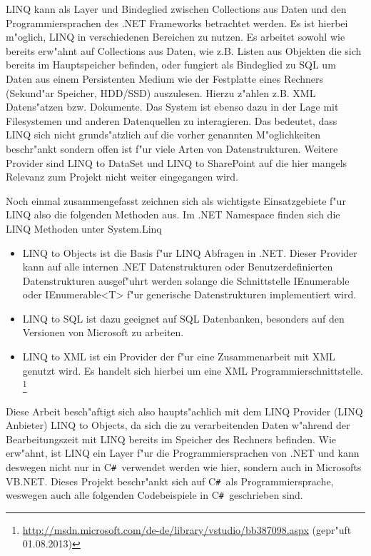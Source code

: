 \documentclass[pagesize, paper=a4, fontsize=12pt,titlepage=true, headings=small, headnosepline, abstractoff, liststotoc, nochapterprefix, plainheadsepline]{scrreprt}
\newcommand{\CSS}{C\texttt{\# }}
\begin{document}
LINQ kann als Layer und Bindeglied zwischen Collections aus Daten und den Programmiersprachen des .NET Frameworks betrachtet werden. Es ist hierbei m"oglich, LINQ in verschiedenen Bereichen zu nutzen. Es arbeitet sowohl wie bereits erw"ahnt auf Collections aus Daten, wie z.B. Listen aus Objekten die sich bereits im Hauptspeicher befinden, oder fungiert als Bindeglied zu SQL um Daten aus einem Persistenten Medium wie der Festplatte eines Rechners (Sekund"ar Speicher, HDD/SSD) auszulesen. Hierzu z"ahlen z.B. XML Datens"atzen bzw. Dokumente. Das System ist ebenso dazu in der Lage mit Filesystemen und anderen Datenquellen zu interagieren. Das bedeutet, dass LINQ sich nicht grunds"atzlich auf die vorher genannten M"oglichkeiten beschr"ankt sondern offen ist f"ur viele Arten von Datenstrukturen. Weitere Provider sind LINQ to DataSet und LINQ to SharePoint auf die hier mangels Relevanz zum Projekt nicht weiter eingegangen wird.
\newline

Noch einmal zusammengefasst zeichnen sich als wichtigste Einsatzgebiete f"ur LINQ also die folgenden Methoden aus. Im .NET Namespace finden sich die LINQ Methoden unter System.Linq
\begin{itemize}
\item LINQ to Objects ist die Basis f"ur LINQ Abfragen in .NET. Dieser Provider kann auf alle internen .NET Datenstrukturen oder Benutzerdefinierten Datenstrukturen ausgef"uhrt werden solange die Schnittstelle IEnumerable oder IEnumerable<T> f"ur generische Datenstrukturen implementiert wird.
\item LINQ to SQL ist dazu geeignet auf SQL Datenbanken, besonders auf den Versionen von Microsoft zu arbeiten.
\item LINQ to XML ist ein Provider der f"ur eine Zusammenarbeit mit XML genutzt wird. Es handelt sich hierbei um eine XML Programmierschnittstelle. \cite{MicrosoftCReferenz.2013} \footnote{\url{http://msdn.microsoft.com/de-de/library/vstudio/bb387098.aspx} (gepr"uft 01.08.2013)}
\end{itemize}

Diese Arbeit besch"aftigt sich also haupts"achlich mit dem LINQ Provider (LINQ Anbieter) LINQ to Objects, da sich die zu verarbeitenden Daten w"ahrend der Bearbeitungszeit mit LINQ bereits im Speicher des Rechners befinden. Wie erw"ahnt, ist LINQ ein Layer f"ur die Programmiersprachen von .NET und kann deswegen nicht nur in \CSS verwendet werden wie hier, sondern auch in Microsofts VB.NET. Dieses Projekt beschr"ankt sich auf \CSS als Programmiersprache, weswegen auch alle folgenden Codebeispiele in \CSS geschrieben sind. %
\end{document}
